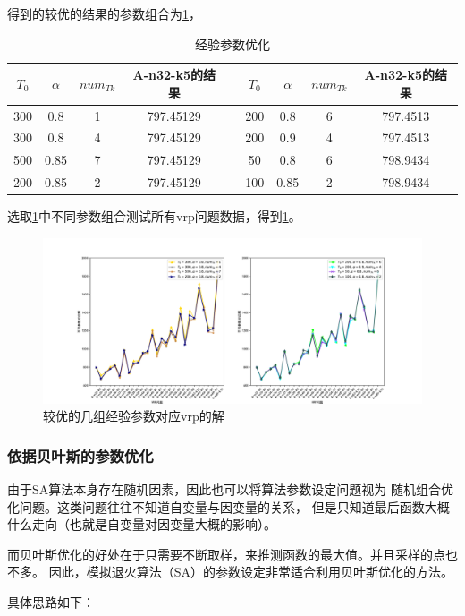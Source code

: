 \documentclass{nudt}
\begin{document}
得到的较优的结果的参数组合为\cref{tab:experience}，
\begin{table}[htbp]
	\centering
	\caption{经验参数优化}
	  \begin{tabular}{ccccccccc}
	  \toprule
	  $ T_0$ & $\alpha $ & $num_{Tk}$ & A-n32-k5的结果 &     & $ T_0$ & $\alpha $ & $num_{Tk}$ & A-n32-k5的结果 \\
	  \midrule
	  300 & 0.8 & 1   & 797.45129 &     & 200 & 0.8 & 6   & 797.4513 \\
	  300 & 0.8 & 4   & 797.45129 &     & 200 & 0.9 & 4   & 797.4513 \\
	  500 & 0.85 & 7   & 797.45129 &     & 50  & 0.8 & 6   & 798.9434 \\
	  200 & 0.85 & 2   & 797.45129 &     & 100 & 0.85 & 2   & 798.9434 \\
	  \bottomrule
	  \end{tabular}%
	\label{tab:experience}%
\end{table}%
选取\cref{tab:experience}中不同参数组合测试所有vrp问题数据，得到\cref{fig:exp}。
\begin{figure}[H]
	\centering
	\includegraphics[width=\textwidth]{image/exp.pdf}
	\caption{较优的几组经验参数对应vrp的解}	
	\label{fig:exp}
\end{figure} 
  
\subsubsection{依据贝叶斯的参数优化}\label{subsubsec:bayes}
由于SA算法本身存在随机因素，因此也可以将算法参数设定问题视为
随机组合优化问题。这类问题往往不知道自变量与因变量的关系，
但是只知道最后函数大概什么走向（也就是自变量对因变量大概的影响）。

而贝叶斯优化的好处在于只需要不断取样\cite{2020Surrogates}，来推测函数的最大值。并且采样的点也不多。
因此，模拟退火算法（SA）的参数设定非常适合利用贝叶斯优化的方法。

具体思路如下：
\end{document}
